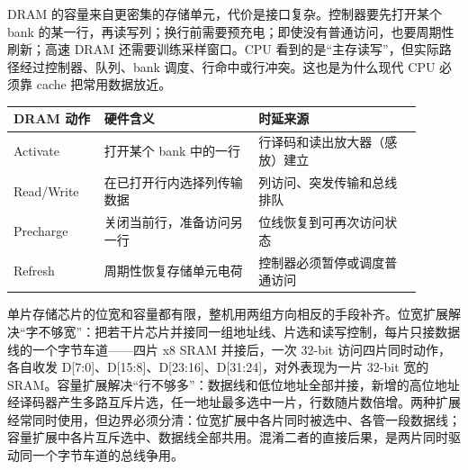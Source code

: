 DRAM 的容量来自更密集的存储单元，代价是接口复杂。控制器要先打开某个 bank 的某一行，再读写列；换行前需要预充电；即使没有普通访问，也要周期性刷新；高速 DRAM 还需要训练采样窗口。CPU 看到的是“主存读写”，但实际路径经过控制器、队列、bank 调度、行命中或行冲突。这也是为什么现代 CPU 必须靠 cache 把常用数据放近。

\begin{longtable}{L{0.2\linewidth}L{0.34\linewidth}L{0.36\linewidth}}
\toprule
DRAM 动作 & 硬件含义 & 时延来源 \\
\midrule
Activate & 打开某个 bank 中的一行 & 行译码和读出放大器（感放）建立 \\\tablerowrule
Read/Write & 在已打开行内选择列传输数据 & 列访问、突发传输和总线排队 \\\tablerowrule
Precharge & 关闭当前行，准备访问另一行 & 位线恢复到可再次访问状态 \\\tablerowrule
Refresh & 周期性恢复存储单元电荷 & 控制器必须暂停或调度普通访问 \\
\bottomrule
\end{longtable}

单片存储芯片的位宽和容量都有限，整机用两组方向相反的手段补齐。位宽扩展解决“字不够宽”：把若干片芯片并接同一组地址线、片选和读写控制，每片只接数据线的一个字节车道——四片 x8 SRAM 并接后，一次 32-bit 访问四片同时动作，各自收发 D[7:0]、D[15:8]、D[23:16]、D[31:24]，对外表现为一片 32-bit 宽的 SRAM。容量扩展解决“行不够多”：数据线和低位地址全部并接，新增的高位地址经译码器产生多路互斥片选，任一地址最多选中一片，行数随片数倍增。两种扩展经常同时使用，但边界必须分清：位宽扩展中各片同时被选中、各管一段数据线；容量扩展中各片互斥选中、数据线全部共用。混淆二者的直接后果，是两片同时驱动同一个字节车道的总线争用。

